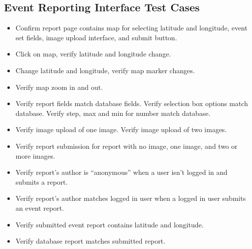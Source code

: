 \subsection{Event Reporting Interface Test Cases}
\begin{itemize}
\item Confirm report page contains map for selecting latitude and longitude, event set fields, image upload interface, and submit button.
\item Click on map, verify latitude and longitude change.
\item Change latitude and longitude, verify map marker changes.
\item Verify map zoom in and out.
\item Verify report fields match database fields. Verify selection box options match database. Verify step, max and min for number match database.
\item Verify image upload of one image. Verify image upload of two images.
\item Verify report submission for report with no image, one image, and two or more images. 
\item Verify report's author is ``anonymous'' when a user isn't logged in and submits a report.
\item Verify report's author matches logged in user when a logged in user submits an event report.
\item Verify submitted event report contains latitude and longitude.
\item Verify database report matches submitted report.
\end{itemize}
